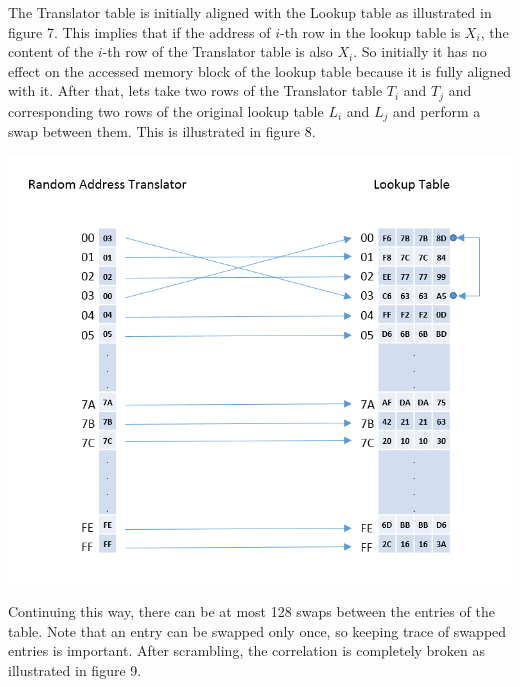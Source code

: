 \documentclass[3p]{elsarticle}
\begin{document}
The Translator table is initially aligned with the Lookup table as illustrated in figure 7. This implies that if the address of $i$-th row in the lookup table is $X_i$, the content of the $i$-th row of the Translator table is also $X_i$. So initially it has no effect on the accessed memory block of the lookup table because it is fully aligned with it. After that, lets take two rows of the Translator table $T_i$ and $T_j$ and corresponding two rows of the original lookup table $L_i$ and $L_j$ and perform a swap between them. This is illustrated in figure 8.

\begin{center}
\includegraphics[scale=0.38,natwidth=785,natheight=666]{Figures/rat-step-1.png}
\label{fig: Random Address Translator after first swap.}
\end{center}

Continuing this way, there can be at most 128 swaps between the entries of the table. Note that an entry can be swapped only once, so keeping trace of swapped entries is important. After scrambling, the correlation is completely broken as illustrated in figure 9.
\end{document}

